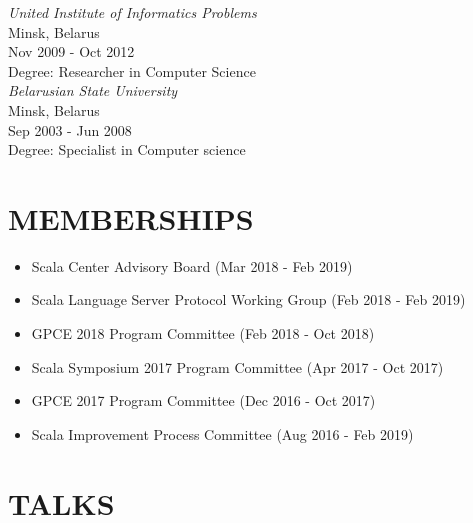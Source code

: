\documentclass[margin, 10pt]{Stylesheet}
\begin{document}
\begin{resume}
\emph{United Institute of Informatics Problems} \\
Minsk, Belarus \\
Nov 2009 - Oct 2012 \\
Degree: Researcher in Computer Science \\

\emph{Belarusian State University} \\
Minsk, Belarus \\
Sep 2003 - Jun 2008 \\
Degree: Specialist in Computer science \\

\section{MEMBERSHIPS}

\begin{itemize} \itemsep -2pt
\item Scala Center Advisory Board (Mar 2018 - Feb 2019)
\item Scala Language Server Protocol Working Group (Feb 2018 - Feb 2019)
\item GPCE 2018 Program Committee (Feb 2018 - Oct 2018)
\item Scala Symposium 2017 Program Committee (Apr 2017 - Oct 2017)
\item GPCE 2017 Program Committee (Dec 2016 - Oct 2017)
\item Scala Improvement Process Committee (Aug 2016 - Feb 2019)
\end{itemize}

\section{TALKS}


\end{resume}
\end{document}
